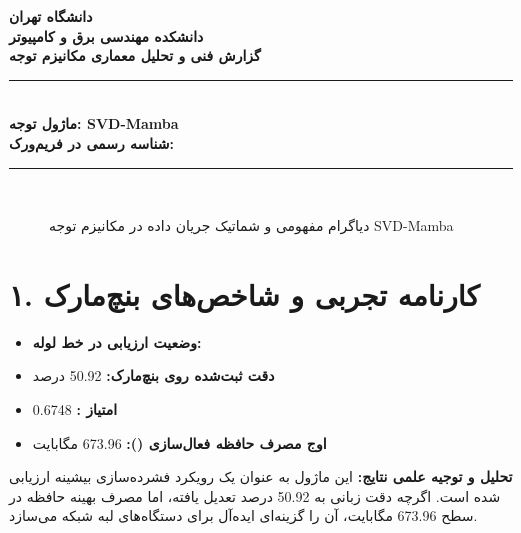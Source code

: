 \documentclass[12pt,a4paper]{article}
\begin{document}
\begin{center}
{\Large\bfseries دانشگاه تهران}\\[0.2cm]
{\large\bfseries دانشکده مهندسی برق و کامپیوتر}\\[0.2cm]
{\large\bfseries گزارش فنی و تحلیل معماری مکانیزم توجه}\\[0.5cm]
\rule{\linewidth}{1pt}\\[0.3cm]
{\LARGE\bfseries ماژول توجه: SVD-Mamba}\\[0.2cm]
{\large \textbf{شناسه رسمی در فریم‌ورک:} }\\[0.2cm]
\rule{\linewidth}{1pt}\\[0.5cm]
\end{center}

\begin{figure}[H]
\centering
{}
\caption{دیاگرام مفهومی و شماتیک جریان داده در مکانیزم توجه SVD-Mamba}
\end{figure}

\section*{۱. کارنامه تجربی و شاخص‌های بنچ‌مارک}
\begin{itemize}
\item \textbf{وضعیت ارزیابی در خط لوله:} 
\item \textbf{دقت ثبت‌شده روی بنچ‌مارک:} 50.92 درصد
\item \textbf{امتیاز :} 0.6748
\item \textbf{اوج مصرف حافظه فعال‌سازی ():} 673.96 مگابایت
\end{itemize}
\textbf{تحلیل و توجیه علمی نتایج:} این ماژول به عنوان یک رویکرد فشرده‌سازی بیشینه ارزیابی شده است. اگرچه دقت زبانی به 50.92 درصد تعدیل یافته، اما مصرف بهینه حافظه در سطح 673.96 مگابایت، آن را گزینه‌ای ایده‌آل برای دستگاه‌های لبه شبکه می‌سازد.
\end{document}
